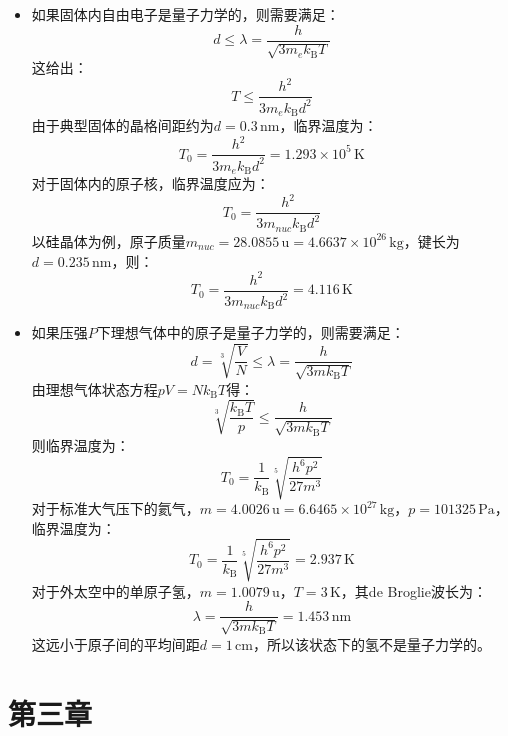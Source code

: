 \documentclass[a4paper,fontset=none]{ctexart}
\renewcommand\hbar\hslash
\begin{document}
\begin{itemize}
        与$P = P_0 \mathrm{e}^{-\tfrac{t}{\tau}}$对比可知，粒子的寿命为：
        \[
            \tau = \frac{\hbar}{2\Gamma}
        \]

        \bigskip
        \item[18.(a)]
        如果固体内自由电子是量子力学的，则需要满足：
        \[
            d \leq \lambda = \frac{h}{\sqrt{3 m_e k_{\mathrm{B}} T}}
        \]
        这给出：
        \[
            T \leq \frac{h^2}{3 m_e k_{\mathrm{B}} d^2}
        \]
        由于典型固体的晶格间距约为$d = 0.3\,\mathrm{nm}$，临界温度为：
        \[
            T_0 = \frac{h^2}{3 m_e k_{\mathrm{B}} d^2} = 1.293 \times 10^{5}\,\mathrm{K}
        \]
        对于固体内的原子核，临界温度应为：
        \[
            T_0 = \frac{h^2}{3 m_{nuc} k_{\mathrm{B}} d^2}
        \]
        以硅晶体为例，原子质量$m_{nuc} = 28.0855\,\mathrm{u} = 4.6637 \times 10^{26}\,\mathrm{kg}$，键长为$d = 0.235\,\mathrm{nm}$，则：
        \[
            T_0 = \frac{h^2}{3 m_{nuc} k_{\mathrm{B}} d^2} = 4.116\,\mathrm{K}
        \]

        \item[18.(b)]
        如果压强$P$下理想气体中的原子是量子力学的，则需要满足：
        \[
            d = \sqrt[3]{\frac{V}{N}} \leq \lambda = \frac{h}{\sqrt{3 m k_{\mathrm{B}} T}}
        \]
        由理想气体状态方程$pV = Nk_{\mathrm{B}}T$得：
        \[
            \sqrt[3]{\frac{k_{\mathrm{B}}T}{p}} \leq \frac{h}{\sqrt{3 m k_{\mathrm{B}} T}}
        \]
        则临界温度为：
        \[
            T_0 = \frac{1}{k_{\mathrm{B}}} \sqrt[5]{\frac{h^6 p^2}{27 m^3}}
        \]
        对于标准大气压下的氦气，$m = 4.0026\,\mathrm{u} = 6.6465 \times 10^{27}\,\mathrm{kg}$，$p = 101325\,\mathrm{Pa}$，临界温度为：
        \[
            T_0 = \frac{1}{k_{\mathrm{B}}} \sqrt[5]{\frac{h^6 p^2}{27 m^3}} = 2.937\,\mathrm{K}
        \]
        对于外太空中的单原子氢，$m = 1.0079\,\mathrm{u}$，$T = 3\,\mathrm{K}$，其de Broglie波长为：
        \[
            \lambda = \frac{h}{\sqrt{3 m k_{\mathrm{B}} T}} = 1.453\,\mathrm{nm}
        \]
        这远小于原子间的平均间距$d = 1\,\mathrm{cm}$，所以该状态下的氢不是量子力学的。
    \end{itemize}

    \newpage
    \section*{第三章}
\end{document}
